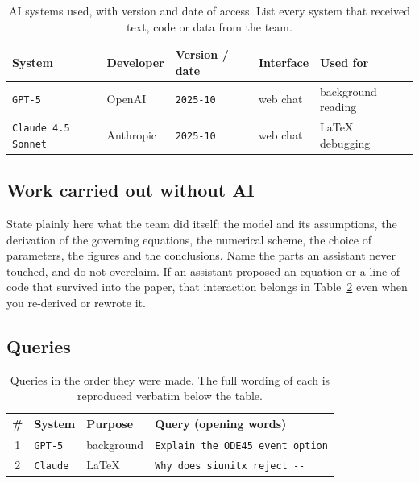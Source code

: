 \begin{table}[H]
  \centering
  \small
  \setlength{\tabcolsep}{4pt}
  \caption{AI systems used, with version and date of access. List every
  system that received text, code or data from the team.}
  \label{tab:ai-systems}
  \begin{tabular}{@{}l l l l p{}@{}}
    \toprule
    System & Developer & Version / date & Interface & Used for \\
    \midrule
    \verb|GPT-5|             & OpenAI    & \verb|2025-10| & web chat & background reading \\
    \verb|Claude 4.5 Sonnet| & Anthropic & \verb|2025-10| & web chat & LaTeX debugging    \\
    \bottomrule
  \end{tabular}
\end{table}

\subsection{Work carried out without AI}
\label{sec:ai-noai}

State plainly here what the team did itself: the model and its assumptions,
the derivation of the governing equations, the numerical scheme, the choice
of parameters, the figures and the conclusions. Name the parts an assistant
never touched, and do not overclaim. If an assistant proposed an equation or
a line of code that survived into the paper, that interaction belongs in
Table~\ref{tab:ai-queries} even when you re-derived or rewrote it.

\subsection{Queries}
\label{sec:ai-queries}

\begin{table}[H]
  \centering
  \small
  \caption{Queries in the order they were made. The full wording of each is
  reproduced verbatim below the table.}
  \label{tab:ai-queries}
  \begin{tabular}{@{}c l l p{}@{}}
    \toprule
    \# & System & Purpose & Query (opening words) \\
    \midrule
    1 & \verb|GPT-5|  & background & \verb|Explain the ODE45 event option| \\
    2 & \verb|Claude| & LaTeX      & \verb|Why does siunitx reject --|     \\
    \bottomrule
  \end{tabular}
\end{table}

